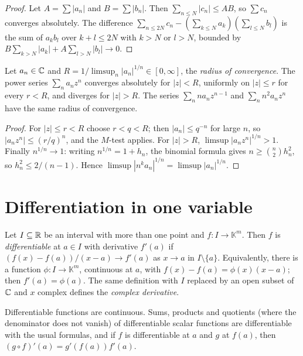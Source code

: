 \begin{proof}
Let $A = \sum|a_n|$ and $B = \sum|b_n|$. Then $\sum_{n \leq N}|c_n| \leq AB$, so $\sum c_n$ converges absolutely. The difference $\sum_{n \leq 2N}c_n - (\sum_{k \leq N}a_k)(\sum_{l \leq N}b_l)$ is the sum
of $a_kb_l$ over $k + l \leq 2N$ with $k > N$ or $l > N$, bounded by $B\sum_{k > N}|a_k| + A\sum_{l > N}|b_l| \to 0$.
\end{proof}

\begin{theorem}\label{real-analysis:theorem-power-series}
Let $a_n \in \mathbb{C}$ and $R = 1/\limsup_n|a_n|^{1/n} \in [0, \infty]$, the \emph{radius of convergence}. The power series $\sum_n a_nz^n$ converges absolutely for $|z| < R$, uniformly on
$|z| \leq r$ for every $r < R$, and diverges for $|z| > R$. The series $\sum_n na_nz^{n-1}$ and $\sum_n n^2a_nz^n$ have the same radius of convergence.
\end{theorem}

\begin{proof}
For $|z| \leq r < R$ choose $r < q < R$; then $|a_n| \leq q^{-n}$ for large $n$, so $|a_nz^n| \leq (r/q)^n$, and the $M$-test applies. For $|z| > R$, $\limsup|a_nz^n|^{1/n} > 1$. Finally
$n^{1/n} \to 1$: writing $n^{1/n} = 1 + h_n$, the binomial formula gives $n \geq \binom{n}{2}h_n^2$, so $h_n^2 \leq 2/(n-1)$. Hence $\limsup|n^ka_n|^{1/n} = \limsup|a_n|^{1/n}$.
\end{proof}

\section{Differentiation in one variable}\label{real-analysis:section-one-variable}

\begin{definition}\label{real-analysis:definition-derivative-one}
Let $I \subseteq \mathbb{R}$ be an interval with more than one point and $f \colon I \to \mathbb{K}^m$. Then $f$ is \emph{differentiable} at $a \in I$ with derivative $f'(a)$ if
$(f(x) - f(a))/(x - a) \to f'(a)$ as $x \to a$ in $I \setminus \{a\}$. Equivalently, there is a function $\phi \colon I \to \mathbb{K}^m$, continuous at $a$, with $f(x) - f(a) = \phi(x)(x - a)$;
then $f'(a) = \phi(a)$. The same definition with $I$ replaced by an open subset of $\mathbb{C}$ and $x$ complex defines the \emph{complex derivative}.
\end{definition}

\begin{proposition}\label{real-analysis:proposition-derivative-rules}
Differentiable functions are continuous. Sums, products and quotients (where the denominator does not vanish) of differentiable scalar functions are differentiable with the usual
formulas, and if $f$ is differentiable at $a$ and $g$ at $f(a)$, then $(g \circ f)'(a) = g'(f(a))f'(a)$.
\end{proposition}

